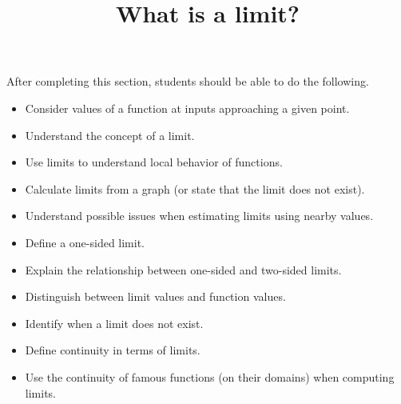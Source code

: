 \documentclass{ximera}
\title{What is a limit?}
\begin{document}
\begin{abstract}
\end{abstract}

\maketitle

\begin{sectionOutcomes}
After completing this section, students should be able to do the following.

\begin{itemize}
	\item Consider  values of a function  at inputs approaching a given point.
	\item Understand the concept of a limit.
        \item Use limits to understand local behavior of functions.
	\item Calculate limits from a graph (or state that the limit does not exist).
	\item Understand possible issues when estimating limits using
          nearby values.
	\item Define a one-sided limit.
	\item Explain the relationship between one-sided and two-sided limits.
	\item Distinguish between limit values and function values.
	\item Identify when a limit does not exist.
	\item Define continuity in terms of limits.
	\item Use the continuity of famous functions (on their domains) when computing limits. 
     
\end{itemize}
\end{sectionOutcomes}
\end{document}
